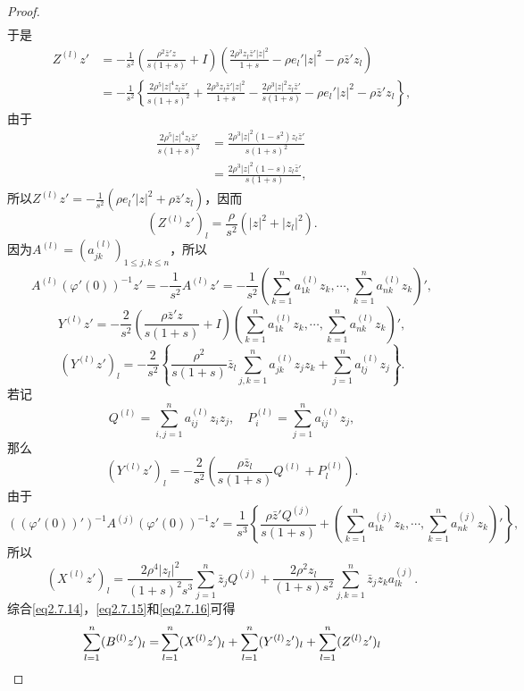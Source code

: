 \begin{proof}
\begin{align*}
\end{align*}
于是
\begin{align*}
	Z^{(l)}z'
	&=-\frac1{s^2}\left(\frac{\rho^2\bar{z}'z}{s(1+s)}+I\right)\left(\frac{2\rho^3 z_l\bar{z}'|z|^2}{1+s}-\rho e_l'|z|^2-\rho\bar{z}'z_l\right)\\
	&=-\frac1{s^2}\left\{\frac{2\rho^5 |z|^4 z_l\bar{z}'}{s(1+s)^2}+\frac{2\rho^3 z_l\bar{z}'|z|^2}{1+s}-\frac{2\rho^3|z|^2 z_l\bar{z}'}{s(1+s)}-\rho e_l'|z|^2-\rho \bar{z}'z_l\right\},
\end{align*}
由于
\begin{align*}
	\frac{2\rho^5|z|^4z_l\bar{z}'}{s(1+s)^2}
	&=\frac{2\rho^3|z|^2(1-s^2)z_l\bar{z}'}{s(1+s)^2}\\
	&=\frac{2\rho^3|z|^2(1-s)z_l\bar{z}'}{s(1+s)},
\end{align*}
所以$Z^{(l)}z'=-\frac1{s^2}(\rho e_l'|z|^2+\rho\bar{z}'z_l)$，因而
\begin{equation}\label{eq2.7.14}
	(Z^{(l)}z')_l=\frac{\rho}{s^2}(|z|^2+|z_l|^2).
\end{equation}
因为$A^{(l)}=(a_{jk}^{(l)})_{1\le j,k\le n}$，所以
\[A^{(l)}(\varphi'(0))^{-1}z'=-\frac1{s^2}A^{(l)}z'=-\frac1{s^2}\left(\sum_{k=1}^{n}a_{1k}^{(l)}z_k,\cdots,\sum_{k=1}^{n}a_{nk}^{(l)}z_k\right)',\]
\[Y^{(l)}z'=-\frac{2}{s^2}\left(\frac{\rho \bar{z}'z}{s(1+s)}+I\right)\left(\sum_{k=1}^{n}a_{1k}^{(l)}z_k,\cdots,\sum_{k=1}^{n}a_{nk}^{(l)}z_k\right)',\]
\[(Y^{(l)}z')_l=-\frac{2}{s^2}\left\{\frac{\rho^2}{s(1+s)}\bar{z}_l\sum_{j,k=1}^{n}a_{jk}^{(l)}z_jz_k+\sum_{j=1}^{n}a_{lj}^{(l)}z_j\right\}.\]
若记
\[Q^{(l)}=\sum_{i,j=1}^{n}a_{ij}^{(l)}z_iz_j,\quad P_i^{(l)}=\sum_{j=1}^{n}a_{ij}^{(l)}z_j,\]
那么
\begin{equation}\label{eq2.7.15}
	(Y^{(l)}z')_l=-\frac{2}{s^2}\left(\frac{\rho\bar{z}_l}{s(1+s)}Q^{(l)}+P_l^{(l)}\right).
\end{equation}
由于
\[((\varphi'(0))')^{-1}A^{(j)}(\varphi'(0))^{-1}z'=\frac1{s^3}\left\{\frac{\rho\bar{z}' Q^{(j)}}{s(1+s)}+\left(\sum_{k=1}^{n}a_{1k}^{(j)}z_k,\cdots,\sum_{k=1}^{n}a_{nk}^{(j)}z_k\right)'\right\},\]
所以
\begin{equation}\label{eq2.7.16}
	(X^{(l)}z')_l=\frac{2\rho^4|z_l|^2}{(1+s)^2 s^3}\sum_{j=1}^{n}\bar{z}_j Q^{(j)}+\frac{2\rho^2 z_l}{(1+s)s^2}\sum_{j,k=1}^{n}\bar{z}_j z_k a_{lk}^{(j)}.
\end{equation}
综合\eqref{eq2.7.14}，\eqref{eq2.7.15}和\eqref{eq2.7.16}可得
\begin{align}\label{eq2.7.17}
	\sum_{l=1}^{n}(B^{(l)}z')_l
	=&\sum_{l=1}^{n}(X^{(l)}z')_l+\sum_{l=1}^{n}(Y^{(l)}z')_l+\sum_{l=1}^{n}(Z^{(l)}z')_l\notag\\

\end{align}
\end{proof}
